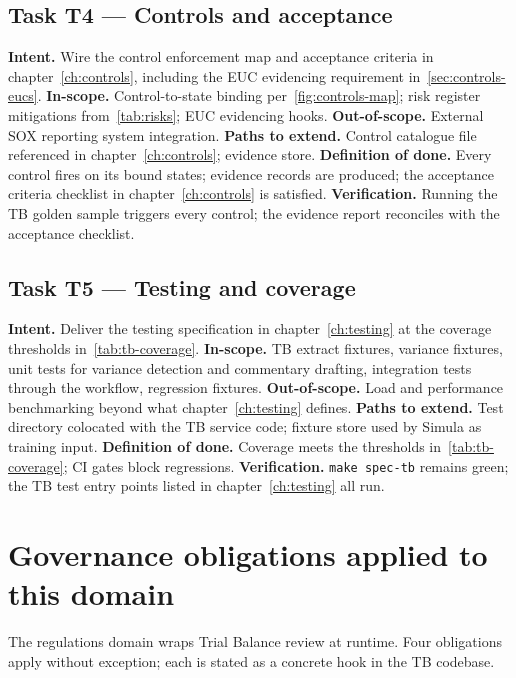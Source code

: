 \documentclass[11pt,a4paper,twoside]{report}
\begin{document}
\subsection*{Task T4 --- Controls and acceptance}
\textbf{Intent.} Wire the control enforcement map and acceptance
criteria in chapter~\ref{ch:controls}, including the EUC evidencing
requirement in~\ref{sec:controls-eucs}.
\textbf{In-scope.} Control-to-state binding per~\ref{fig:controls-map};
risk register mitigations from~\ref{tab:risks}; EUC evidencing hooks.
\textbf{Out-of-scope.} External SOX reporting system integration.
\textbf{Paths to extend.} Control catalogue file referenced in
chapter~\ref{ch:controls}; evidence store.
\textbf{Definition of done.} Every control fires on its bound
states; evidence records are produced; the acceptance criteria
checklist in chapter~\ref{ch:controls} is satisfied.
\textbf{Verification.} Running the TB golden sample triggers every
control; the evidence report reconciles with the acceptance
checklist.

\subsection*{Task T5 --- Testing and coverage}
\textbf{Intent.} Deliver the testing specification in
chapter~\ref{ch:testing} at the coverage thresholds
in~\ref{tab:tb-coverage}.
\textbf{In-scope.} TB extract fixtures, variance fixtures, unit
tests for variance detection and commentary drafting, integration
tests through the workflow, regression fixtures.
\textbf{Out-of-scope.} Load and performance benchmarking beyond what
chapter~\ref{ch:testing} defines.
\textbf{Paths to extend.} Test directory colocated with the TB
service code; fixture store used by Simula as training input.
\textbf{Definition of done.} Coverage meets the thresholds
in~\ref{tab:tb-coverage}; CI gates block regressions.
\textbf{Verification.} \texttt{make spec-tb} remains green; the TB
test entry points listed in chapter~\ref{ch:testing} all run.


\section{Governance obligations applied to this domain}
\label{sec:agent-governance}
The regulations domain wraps Trial Balance review at runtime. Four
obligations apply without exception; each is stated as a concrete
hook in the TB codebase.
\end{document}
